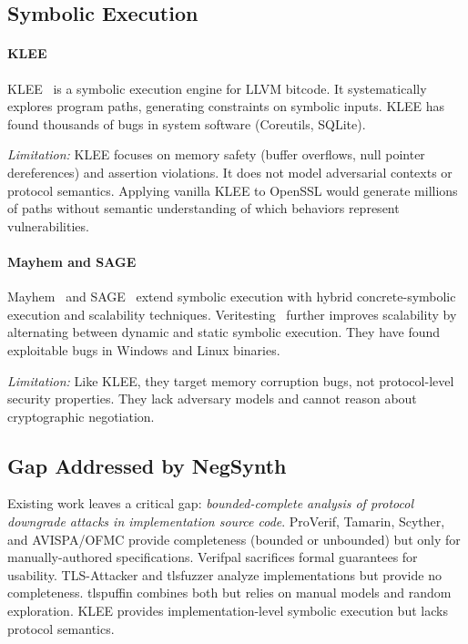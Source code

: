 \documentclass[10pt,twocolumn]{article}
\begin{document}
\subsection{Symbolic Execution}

\paragraph{KLEE}
KLEE~\cite{cadar2008klee} is a symbolic execution engine for LLVM bitcode. It systematically explores program paths, generating constraints on symbolic inputs. KLEE has found thousands of bugs in system software (Coreutils, SQLite).

\emph{Limitation:} KLEE focuses on memory safety (buffer overflows, null pointer dereferences) and assertion violations. It does not model adversarial contexts or protocol semantics. Applying vanilla KLEE to OpenSSL would generate millions of paths without semantic understanding of which behaviors represent vulnerabilities.

\paragraph{Mayhem and SAGE}
Mayhem~\cite{cha2012mayhem} and SAGE~\cite{godefroid2012sage} extend symbolic execution with hybrid concrete-symbolic execution and scalability techniques. Veritesting~\cite{avgerinos2014enhancing} further improves scalability by alternating between dynamic and static symbolic execution. They have found exploitable bugs in Windows and Linux binaries.

\emph{Limitation:} Like KLEE, they target memory corruption bugs, not protocol-level security properties. They lack adversary models and cannot reason about cryptographic negotiation.

\subsection{Gap Addressed by NegSynth}

Existing work leaves a critical gap: \emph{bounded-complete analysis of protocol downgrade attacks in implementation source code}. ProVerif, Tamarin, Scyther, and AVISPA/OFMC provide completeness (bounded or unbounded) but only for manually-authored specifications. Verifpal sacrifices formal guarantees for usability. TLS-Attacker and tlsfuzzer analyze implementations but provide no completeness. tlspuffin combines both but relies on manual models and random exploration. KLEE provides implementation-level symbolic execution but lacks protocol semantics.
\end{document}
